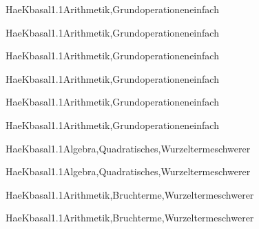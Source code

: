 \documentclass[12pt]{article}
\begin{document}
\begin{Add}{HaeK}{basal1.1}{Arithmetik,Grundoperationen}{einfach}
\solution{ }
\end{Add}
\begin{Add}{HaeK}{basal1.1}{Arithmetik,Grundoperationen}{einfach}
\end{Add}

\begin{Add}{HaeK}{basal1.1}{Arithmetik,Grundoperationen}{einfach}
\solution{ }
\end{Add}
\begin{Add}{HaeK}{basal1.1}{Arithmetik,Grundoperationen}{einfach}
\end{Add}

\begin{Add}{HaeK}{basal1.1}{Arithmetik,Grundoperationen}{einfach}
\solution{ }
\end{Add}
\begin{Add}{HaeK}{basal1.1}{Arithmetik,Grundoperationen}{einfach}
\end{Add}

\begin{Add}{HaeK}{basal1.1}{Algebra,Quadratisches,Wurzelterme}{schwerer}
\solution{ }
\end{Add}
\begin{Add}{HaeK}{basal1.1}{Algebra,Quadratisches,Wurzelterme}{schwerer}
\end{Add}

\begin{Add}{HaeK}{basal1.1}{Arithmetik,Bruchterme,Wurzelterme}{schwerer}
\solution{ }
\end{Add}
\begin{Add}{HaeK}{basal1.1}{Arithmetik,Bruchterme,Wurzelterme}{schwerer}
\end{Add}
\end{document}
